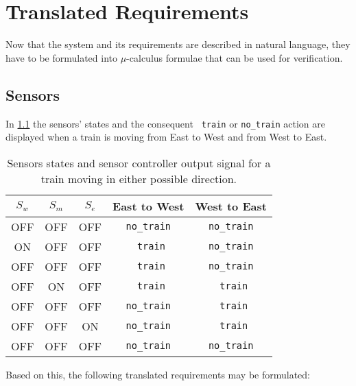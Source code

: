\documentclass[final]{report}
\begin{document}
\chapter{Translated Requirements}
Now that the system and its requirements are described in natural language, they have to be formulated into $\mu$-calculus formulae that can be used for verification.

\section{Sensors}
In \cref{tab:sensors_transitions} the sensors' states and the consequent \texttt{    train} or \texttt{no\_train} action are displayed when a train is moving from East to West and from West to East.

\begin{table}[H]
\centering
	\begin{tabular}{|c|c|c|c|c|}
	\hline 
	$S_{w}$ & $S_{m}$ & $S_{e}$ & East to West & West to East \\ \hline 
	OFF & OFF & OFF & \texttt{no\_train} & \texttt{no\_train} \\ \hline 
	ON  & OFF & OFF & \texttt{    train} & \texttt{no\_train} \\ \hline 
	OFF & OFF & OFF & \texttt{    train} & \texttt{no\_train} \\ \hline 
	OFF & ON  & OFF & \texttt{    train} & \texttt{    train} \\ \hline 
	OFF & OFF & OFF & \texttt{no\_train} & \texttt{    train} \\ \hline 
	OFF & OFF & ON  & \texttt{no\_train} & \texttt{    train} \\ \hline 
	OFF & OFF & OFF & \texttt{no\_train} & \texttt{no\_train} \\ \hline 
	\end{tabular}
	\caption{Sensors states and sensor controller output signal for a train moving in either possible direction.}
	\label{tab:sensors_transitions}
\end{table}

Based on this, the following translated requirements may be formulated: 
\end{document}
